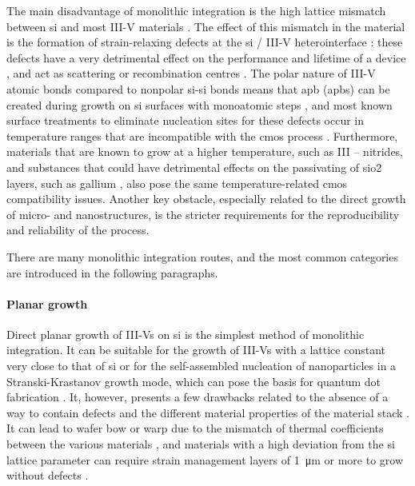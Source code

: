 The main disadvantage of monolithic integration is the high lattice mismatch between \acl{si} and most III-V materials \cite{Kuech2016}. The effect of this mismatch in the material is the formation of strain-relaxing defects at the \acl{si} / III-V heterointerface \cite{Kunert2018, Shi2021}: these defects have a very detrimental effect on the performance and lifetime of a device \cite{Mahajan2000, Zenari2021}, and act as scattering or recombination centres \cite{Jeon2015}. The polar nature of III-V atomic bonds compared to nonpolar \acs{si}-\acs{si} bonds means that \acl{apb} (\acs{apb}s) can be created during growth on \acl{si} surfaces with monoatomic steps \cite{Kunert2018}, and most known surface treatments to eliminate nucleation sites for these defects occur in temperature ranges that are incompatible with the \acs{cmos} process \cite{Miller2000}. Furthermore, materials that are known to grow at a higher temperature, such as III – nitrides, and substances that could have detrimental effects on the passivating of \acf{sio2} layers, such as gallium \cite{Miller2000}, also pose the same temperature-related \acs{cmos} compatibility issues. Another key obstacle, especially related to the direct growth of micro- and nanostructures, is the stricter requirements for the reproducibility and reliability of the process.

There are many monolithic integration routes, and the most common categories are introduced in the following paragraphs.

\paragraph{Planar growth} Direct planar growth of III-Vs on \acl{si} is the simplest method of monolithic integration. It can be suitable for the growth of III-Vs with a lattice constant very close to that of \acl{si} or for the self-assembled nucleation of nanoparticles in a Stranski-Krastanov growth mode, which can pose the basis for quantum dot fabrication \cite{Shi2016, Reithmaier2016}. It, however, presents a few drawbacks related to the absence of a way to contain defects and the different material properties of the material stack \cite{Ravash2012}. It can lead to wafer bow or warp due to the mismatch of thermal coefficients between the various materials \cite{Miyoshi2016, Wang2017_2}, and materials with a high deviation from the \acl{si} lattice parameter can require strain management layers of \qty{1}{\micro\metre} or more to grow without defects \cite{Wang2017_2, Cantoro2012, Huang2022}.
\par
